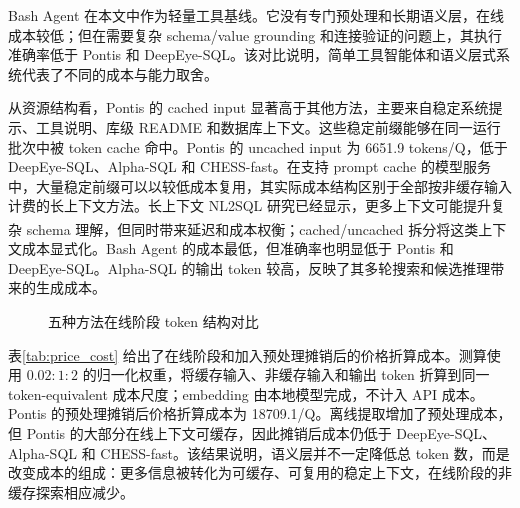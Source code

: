 \documentclass[
    bachelor,
    pdflinks,
]{xjtuthesis}
\newcommand{\upcite}[1]{\textsuperscript{\cite{#1}}}
\begin{document}
Bash Agent 在本文中作为轻量工具基线。它没有专门预处理和长期语义层，在线成本较低；但在需要复杂 schema/value grounding 和连接验证的问题上，其执行准确率低于 Pontis 和 DeepEye-SQL。该对比说明，简单工具智能体和语义层式系统代表了不同的成本与能力取舍。

从资源结构看，Pontis 的 cached input 显著高于其他方法，主要来自稳定系统提示、工具说明、库级 README 和数据库上下文。这些稳定前缀能够在同一运行批次中被 token cache 命中。Pontis 的 uncached input 为 6651.9 tokens/Q，低于 DeepEye-SQL、Alpha-SQL 和 CHESS-fast。在支持 prompt cache 的模型服务中，大量稳定前缀可以以较低成本复用，其实际成本结构区别于全部按非缓存输入计费的长上下文方法。长上下文 NL2SQL 研究已经显示，更多上下文可能提升复杂 schema 理解，但同时带来延迟和成本权衡\upcite{chung2025longContextNL2SQL}；cached/uncached 拆分将这类上下文成本显式化。Bash Agent 的成本最低，但准确率也明显低于 Pontis 和 DeepEye-SQL。Alpha-SQL 的输出 token 较高，反映了其多轮搜索和候选推理带来的生成成本。

\begin{figure}[htbp]
  \centering
  \caption{五种方法在线阶段 token 结构对比}
  \label{fig:token-breakdown}
\end{figure}

表\ref{tab:price_cost} 给出了在线阶段和加入预处理摊销后的价格折算成本。测算使用 $0.02:1:2$ 的归一化权重，将缓存输入、非缓存输入和输出 token 折算到同一 token-equivalent 成本尺度；embedding 由本地模型完成，不计入 API 成本。Pontis 的预处理摊销后价格折算成本为 18709.1/Q。离线提取增加了预处理成本，但 Pontis 的大部分在线上下文可缓存，因此摊销后成本仍低于 DeepEye-SQL、Alpha-SQL 和 CHESS-fast。该结果说明，语义层并不一定降低总 token 数，而是改变成本的组成：更多信息被转化为可缓存、可复用的稳定上下文，在线阶段的非缓存探索相应减少。
\end{document}
